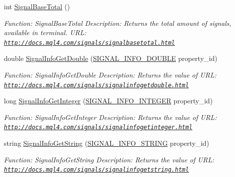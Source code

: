 \begin{DoxyCompactItemize}
int \hyperlink{class_m_q_l4_c_sharp_1_1_base_1_1_m_q_l_base_a4a31429ca7ad2b52bea465258122baa0}{Signal\+Base\+Total} ()
\begin{DoxyCompactList}\small\item\em Function\+: Signal\+Base\+Total Description\+: Returns the total amount of signals, available in terminal. U\+RL\+: \href{http://docs.mql4.com/signals/signalbasetotal.html}{\tt http\+://docs.\+mql4.\+com/signals/signalbasetotal.\+html} \end{DoxyCompactList}\item 
double \hyperlink{class_m_q_l4_c_sharp_1_1_base_1_1_m_q_l_base_a9dc89791962951aba68069e19ff691fb}{Signal\+Info\+Get\+Double} (\hyperlink{namespace_m_q_l4_c_sharp_1_1_base_1_1_enums_a80b17d9a3dd57e02283914b41c3a9f60}{S\+I\+G\+N\+A\+L\+\_\+\+I\+N\+F\+O\+\_\+\+D\+O\+U\+B\+LE} property\+\_\+id)
\begin{DoxyCompactList}\small\item\em Function\+: Signal\+Info\+Get\+Double Description\+: Returns the value of U\+RL\+: \href{http://docs.mql4.com/signals/signalinfogetdouble.html}{\tt http\+://docs.\+mql4.\+com/signals/signalinfogetdouble.\+html} \end{DoxyCompactList}\item 
long \hyperlink{class_m_q_l4_c_sharp_1_1_base_1_1_m_q_l_base_ac7f3720f0eefc4bc1598d9ea5bd5ed3e}{Signal\+Info\+Get\+Integer} (\hyperlink{namespace_m_q_l4_c_sharp_1_1_base_1_1_enums_ab3373be5a69a03b44356baab2b3afc4d}{S\+I\+G\+N\+A\+L\+\_\+\+I\+N\+F\+O\+\_\+\+I\+N\+T\+E\+G\+ER} property\+\_\+id)
\begin{DoxyCompactList}\small\item\em Function\+: Signal\+Info\+Get\+Integer Description\+: Returns the value of U\+RL\+: \href{http://docs.mql4.com/signals/signalinfogetinteger.html}{\tt http\+://docs.\+mql4.\+com/signals/signalinfogetinteger.\+html} \end{DoxyCompactList}\item 
string \hyperlink{class_m_q_l4_c_sharp_1_1_base_1_1_m_q_l_base_aaacc1d32dcb53faa6454ccfa9872324d}{Signal\+Info\+Get\+String} (\hyperlink{namespace_m_q_l4_c_sharp_1_1_base_1_1_enums_abe76a4354b6e07d21151260f01f8e0a0}{S\+I\+G\+N\+A\+L\+\_\+\+I\+N\+F\+O\+\_\+\+S\+T\+R\+I\+NG} property\+\_\+id)
\begin{DoxyCompactList}\small\item\em Function\+: Signal\+Info\+Get\+String Description\+: Returns the value of U\+RL\+: \href{http://docs.mql4.com/signals/signalinfogetstring.html}{\tt http\+://docs.\+mql4.\+com/signals/signalinfogetstring.\+html} \end{DoxyCompactList}\item 

\end{DoxyCompactItemize}
